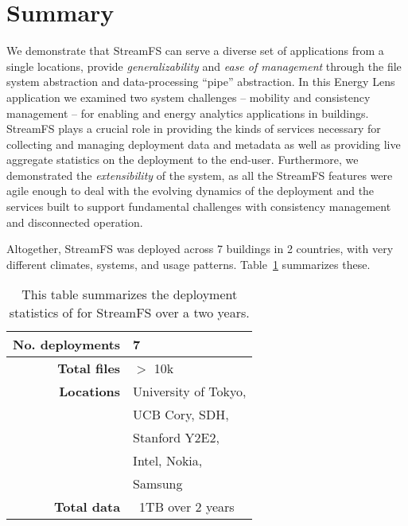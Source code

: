 \section{Summary}

We demonstrate that StreamFS can serve a diverse set of applications from a single locations, provide \emph{generalizability}
and \emph{ease of management} through the file system abstraction and data-processing ``pipe'' abstraction.
In this Energy Lens application we examined two system challenges -- mobility and consistency management -- for enabling and energy 
analytics applications in buildings.  StreamFS plays a crucial role in providing the kinds of services necessary 
for collecting and managing deployment data and metadata as well as providing live aggregate statistics on the deployment
to the end-user.  Furthermore, we demonstrated the \emph{extensibility} of the system, as all the StreamFS
features were agile enough to deal with the evolving dynamics of the deployment and the services built to support
fundamental challenges with consistency management and disconnected operation.


Altogether, StreamFS was deployed across 7 buildings in 2 countries, with very different climates, systems, and 
usage patterns.  Table~\ref{tab:sfs_depstats} summarizes these.

\begin{table}
\begin{center}
  \begin{tabular}{| r | l | }
    \hline
    \textbf{No. deployments}	&   7     					\\ \hline
    \textbf{Total files}      	&   $>$ 10k					\\ \hline
    \textbf{Locations}     		&   University of Tokyo,	\\
    							& 	UCB Cory, SDH,			\\
    							& 	Stanford Y2E2,			\\
    							&	Intel, Nokia,			\\
    							&	Samsung					\\ \hline
    \textbf{Total data}			&	~1TB over 2 years		\\	\hline
  \end{tabular}
\caption{This table summarizes the deployment statistics of for StreamFS over a two years.}
\label{tab:sfs_depstats}
\end{center}
\end{table}

